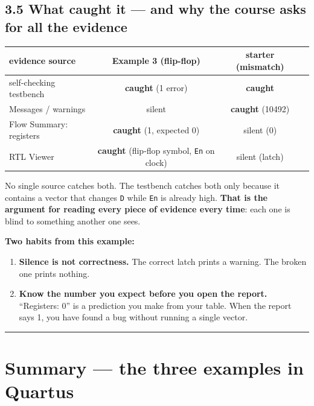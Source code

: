 \documentclass[11pt]{article}
\newcommand{\code}[1]{\texttt{#1}}
\newcommand{\hr}{\vspace{2pt}\hrule\vspace{6pt}}
\begin{document}
\subsection*{3.5 What caught it --- and why the course asks for all the evidence}

\begin{center}
\begin{tabular}{lccc}
\toprule
evidence source & Example 3 (flip-flop) & starter (mismatch) \\
\midrule
self-checking testbench & \textbf{caught} (1 error) & \textbf{caught} \\
Messages / warnings & silent & \textbf{caught} (10492) \\
Flow Summary: registers & \textbf{caught} (1, expected 0) & silent (0) \\
RTL Viewer & \textbf{caught} (flip-flop symbol, \code{En} on clock) & silent (latch) \\
\bottomrule
\end{tabular}
\end{center}

No single source catches both. The testbench catches both only because it contains a
vector that changes \code{D} while \code{En} is already high. \textbf{That is the
argument for reading every piece of evidence every time}: each one is blind to
something another one sees.

\textbf{Two habits from this example:}
\begin{enumerate}[leftmargin=2em,itemsep=1pt]
\item \textbf{Silence is not correctness.} The correct latch prints a warning. The
broken one prints nothing.
\item \textbf{Know the number you expect before you open the report.} ``Registers: 0''
is a prediction you make from your table. When the report says 1, you have found a
bug without running a single vector.
\end{enumerate}

\vspace{4pt}\hr

\section*{Summary --- the three examples in Quartus}
\end{document}
